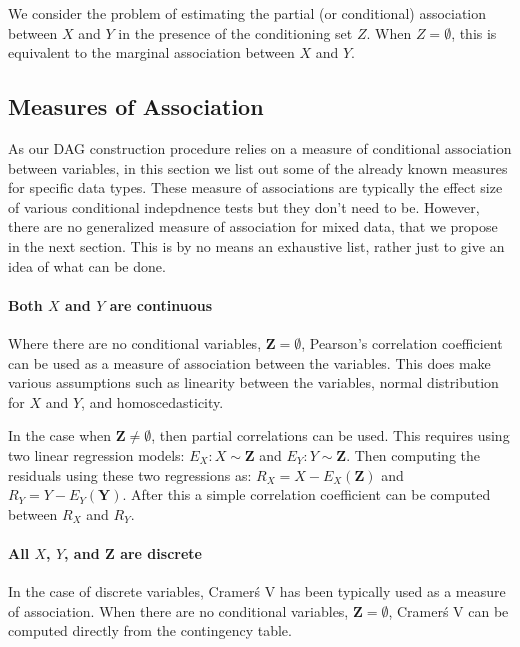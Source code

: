\documentclass[letterpaper]{article} %
\begin{document}
We consider the problem of estimating the partial (or conditional) association
between $ X $ and $ Y $ in the presence of the conditioning set $ Z $. When $ Z
= \emptyset $, this is equivalent to the marginal association between $ X $ and
$ Y $.


\subsection{Measures of Association}
As our DAG construction procedure relies on a measure of conditional
association between variables, in this section we list out some of the already
known measures for specific data types. These measure of associations are
typically the effect size of various conditional indepdnence tests but they
don't need to be. However, there are no generalized measure of association for
mixed data, that we propose in the next section. This is by no means an
exhaustive list, rather just to give an idea of what can be done.

\paragraph{Both $ X $ and $ Y $ are continuous}
Where there are no conditional variables, $ \bm{Z} = \emptyset $, Pearson's
correlation coefficient can be used as a measure of association between the
variables. This does make various assumptions such as linearity between the
variables, normal distribution for $ X $ and $ Y $, and homoscedasticity.

In the case when $ \bm{Z} \neq \emptyset $, then partial correlations can be
used. This requires using two linear regression models: $ E_X: X \sim \bm{Z} $
and $ E_Y: Y \sim \bm{Z} $. Then computing the residuals using these two
regressions as: $ R_X = X - E_X(\bm{Z}) $ and $ R_Y = Y - E_Y(\bm{Y}) $. After
this a simple correlation coefficient can be computed between $ R_X $ and $ R_Y $.

\paragraph{All $ X $, $ Y $, and $ \bm{Z} $ are discrete}

In the case of discrete variables, Cramer\'s V has been typically used as a
measure of association. When there are no conditional variables, $ \bm{Z} = \emptyset $,
Cramer\'s V can be computed directly from the contingency table.
\end{document}
